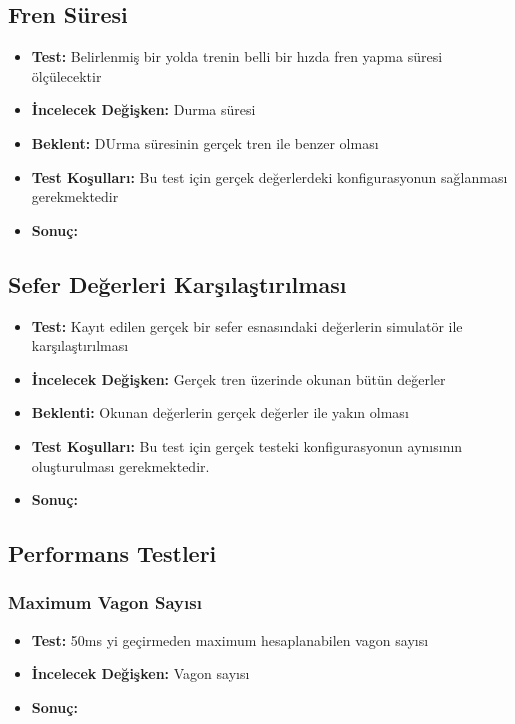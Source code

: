 \documentclass[10pt,a4paper]{article}
\begin{document}
\subsection{Fren Süresi}
\begin{itemize}
\item \textbf{Test:} Belirlenmiş bir yolda trenin belli bir hızda fren yapma süresi ölçülecektir\\
\item \textbf{İncelecek Değişken:} Durma süresi\\
\item \textbf{Beklent:} DUrma süresinin gerçek tren ile benzer olması\\
\item \textbf{Test Koşulları:} Bu test için gerçek değerlerdeki konfigurasyonun sağlanması gerekmektedir \\
\item \textbf{Sonuç:}
\end{itemize}

\subsection{Sefer Değerleri Karşılaştırılması}
\begin{itemize}
\item \textbf{Test:} Kayıt edilen gerçek bir sefer esnasındaki değerlerin simulatör ile karşılaştırılması\\
\item \textbf{İncelecek Değişken:} Gerçek tren üzerinde okunan bütün değerler \\
\item \textbf{Beklenti:} Okunan değerlerin gerçek değerler ile yakın olması\\
\item \textbf{Test Koşulları:} Bu test için gerçek testeki konfigurasyonun aynısının oluşturulması gerekmektedir. \\
\item \textbf{Sonuç:}
\end{itemize}

\subsection{Performans Testleri}

\subsubsection{Maximum Vagon Sayısı}
\begin{itemize}
\item \textbf{Test:} 50ms yi geçirmeden maximum hesaplanabilen vagon sayısı\\
\item \textbf{İncelecek Değişken:} Vagon sayısı\\
\item \textbf{Sonuç:}
\end{itemize}
\end{document}
